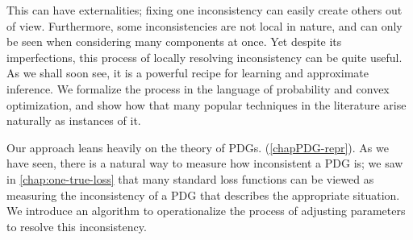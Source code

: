 This can have externalities; fixing one inconsistency can easily create
    others out of view.
Furthermore, some inconsistencies
    are not local in nature,
    and can only be seen when considering many components at once.
Yet despite its imperfections,
    this process of locally resolving inconsistency  can be quite useful.
    As we shall soon see,
    it is a powerful recipe for learning and approximate inference.
%
We formalize the process
    in the language of probability and
    convex optimization,
    and show how that many popular techniques in the literature
    arise naturally as instances of it.



Our approach leans heavily on the theory of PDGs. 
        (\cref{chapPDG-repr}).
As we have seen, there is a natural way
    to measure how inconsistent a PDG is;
    we saw in \cref{chap:one-true-loss} that
    many standard loss functions
    can be viewed as measuring the inconsistency of a PDG that
    describes the appropriate situation.
%
%
We introduce an algorithm
    to operationalize
    the process of adjusting parameters
    to resolve this inconsistency.

